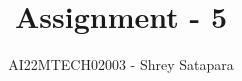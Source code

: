 \documentclass[journal,12pt,twocolumn]{IEEEtran}
\begin{document}
\let\StandardTheFigure\thefigure
\let\vec\mathbf
\renewcommand{\thefigure}{\theproblem}



\def\putbox#1#2#3{\makebox[0in][l]{\makebox[#1][l]{}\raisebox{\baselineskip}[0in][0in]{\raisebox{#2}[0in][0in]{#3}}}}
     \def\rightbox#1{\makebox[0in][r]{#1}}
     \def\centbox#1{\makebox[0in]{#1}}
     \def\topbox#1{\raisebox{-\baselineskip}[0in][0in]{#1}}
     \def\midbox#1{\raisebox{-0.5\baselineskip}[0in][0in]{#1}}

\vspace{3cm}

\title{
Assignment - 5
}
\author{AI22MTECH02003 - Shrey Satapara}	


\maketitle
\end{document}

